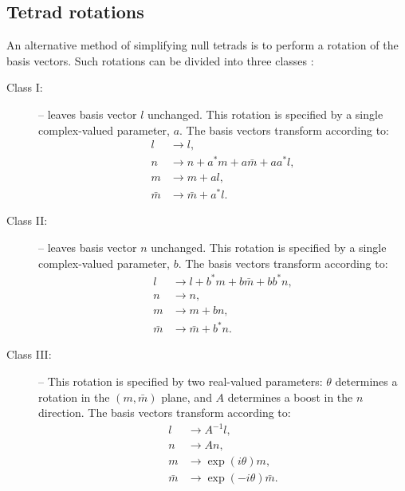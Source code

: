 \documentclass{article}
\begin{document}
\subsection{Tetrad rotations}
%
An alternative method of simplifying null tetrads is to perform a rotation
of the basis vectors. Such rotations can be divided into three 
classes \cite{newman/penrose:1962}:
\begin{description}
  \item[Class I:] -- leaves basis vector $l$ unchanged. This rotation is
    specified by a single complex-valued parameter, $a$. The basis vectors
    transform according to:
    \begin{align*}
      l & \longrightarrow l, \\
      n & \longrightarrow n + a^\ast m + a \bar{m} + a a^\ast l, \\
      m & \longrightarrow m + a l, \\
      \bar{m} & \longrightarrow \bar{m} + a^\ast l.
    \end{align*}
%
  \item[Class II:] -- leaves basis vector $n$ unchanged. This rotation is
    specified by a single complex-valued parameter, $b$. The basis vectors
    transform according to:
    \begin{align*}
      l & \longrightarrow l + b^\ast m + b \bar{m} + b b^\ast n,\\
      n & \longrightarrow n, \\
      m & \longrightarrow m + b n, \\
      \bar{m} & \longrightarrow \bar{m} + b^\ast n.
    \end{align*}
%
  \item[Class III:] -- This rotation is specified by two real-valued 
    parameters: $\theta$ determines a rotation in the $(m,\bar{m})$ plane,
    and $A$ determines a boost in the $n$ direction. The basis vectors
    transform according to:
    \begin{align*}
      l & \longrightarrow A^{-1} l, \\
      n & \longrightarrow A n, \\
      m & \longrightarrow \exp (i\theta) m, \\
      \bar{m} & \longrightarrow \exp (-i\theta) \bar{m}.
    \end{align*}
  \end{description}
\end{document}

